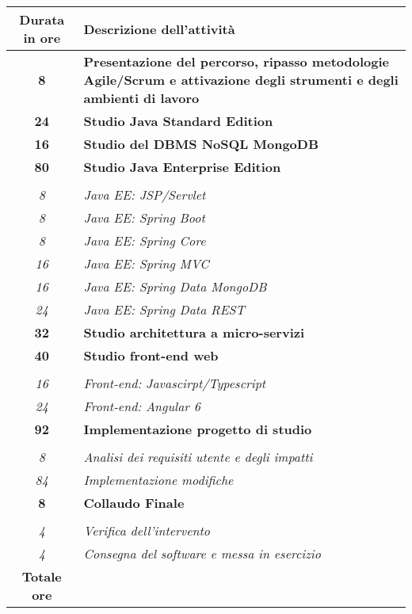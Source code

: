 

\begin{tabularx}{\textwidth}{|cX|}
	\hline
	\textbf{Durata in ore} & \textbf{Descrizione dell'attività} \\\hline

	\textbf{8} & \textbf{Presentazione del percorso, ripasso metodologie Agile/Scrum e attivazione degli strumenti e degli ambienti di lavoro} \\
\hline

    \textbf{24} & \textbf{Studio Java Standard Edition}\\\hline
    \textbf{16} & \textbf{Studio del DBMS NoSQL MongoDB}\\\hline
    \textbf{80} & \textbf{Studio Java Enterprise Edition}\\\hdashline

    \multirow{6}{0cm}\\
    \textit{8} &
    \textit{Java EE: JSP/Servlet}\\
    \textit{8} &
    \textit{Java EE: Spring Boot}\\
    \textit{8} &
    \textit{Java EE: Spring Core}\\
    \textit{16} &
    \textit{Java EE: Spring MVC}\\
    \textit{16} &
    \textit{Java EE: Spring Data MongoDB}\\
    \textit{24} &
    \textit{Java EE: Spring Data REST}\\\hline

    \textbf{32} & \textbf{Studio architettura a micro-servizi} \\\hline

    \textbf{40} & \textbf{Studio front-end web}\\\hdashline
    \multirow{2}{0cm}\\
    \textit{16} &
    \textit{Front-end: Javascirpt/Typescript}\\
    \textit{24} &
    \textit{Front-end: Angular 6}\\\hline

    \textbf{92} & \textbf{Implementazione progetto di studio}\\\hdashline
    \multirow{2}{0cm}\\
    \textit{8} &
    \textit{Analisi dei requisiti utente e degli impatti}\\
    \textit{84} &
    \textit{Implementazione modifiche} \\\hline

    \textbf{8} & \textbf{Collaudo Finale}\\\hdashline
    \multirow{2}{0cm}\\
    \textit{4} &
    \textit{Verifica dell'intervento}\\
    \textit{4} &
    \textit{Consegna del software e messa in esercizio} \\\hline

	\textbf{Totale ore} & \multicolumn{1}{c|}{\textbf{\totaleOre}} \\\hline


\end{tabularx}
